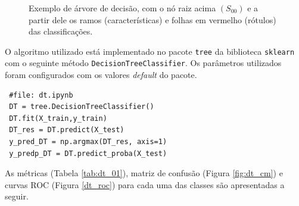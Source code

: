 \documentclass[
	article,			%
	11pt,				%
	oneside,			%
	a4paper,			%
	english,			%
	brazil,				%
	sumario=tradicional
	]{abntex2}
\begin{document}
\begin{figure}
\begin{center}
\end{center}
\label{ex_dt}
 \caption{Exemplo de árvore de decisão, com o nó raiz acima $(S_{00})$ e a partir dele os ramos (características) e folhas em vermelho (rótulos) das classificações.}
\end{figure}


O algoritmo utilizado está implementado no pacote \verb|tree| da biblioteca \verb|sklearn| com o seguinte método \verb|DecisionTreeClassifier|. Os parâmetros utilizados foram configurados com os valores \textit{default} do pacote.

\begin{verbatim}
 #file: dt.ipynb
 DT = tree.DecisionTreeClassifier()
 DT.fit(X_train,y_train)
 DT_res = DT.predict(X_test)
 y_pred_DT = np.argmax(DT_res, axis=1)
 y_predp_DT = DT.predict_proba(X_test)
\end{verbatim}

As métricas (Tabela \ref{tab:dt_01}), matriz de confusão (Figura \ref{fig:dt_cm}) e curvas ROC (Figura \ref{dt_roc}) para cada uma das classes são apresentadas a seguir.
\end{document}
